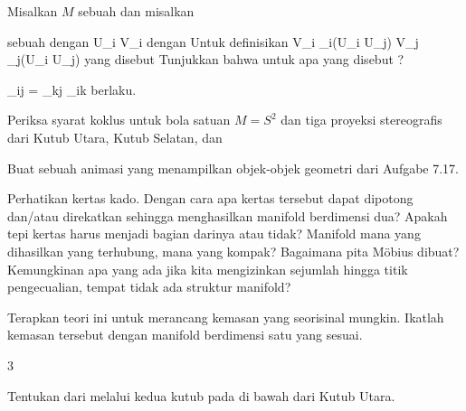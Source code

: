 {}
{

Misalkan $M$ sebuah
dan misalkan

 sebuah
dengan
 {U_i } { V_i
} {}
dengan
 Untuk
 definisikan
 {V_i \cap \alpha_i(U_i \cap U_j)  } { V_j \cap \alpha_j(U_i \cap U_j)
} {}
yang disebut
Tunjukkan bahwa untuk
 apa yang disebut  {}
 {?} {}

\mavergleichskettedisp
{\vergleichskette
{ \varphi_{ij}
}
{ =} {\varphi_{kj} \circ \varphi_{ik}
}
{ } {
}
{ } {
}
{ } {
}
}
{}{}{}
berlaku.

}
{} {}

{}
{

Periksa syarat koklus
 {} {}
untuk bola satuan $M=S^2$ dan tiga proyeksi stereografis dari Kutub Utara, Kutub Selatan, dan

}
{} {}

{}
{

Buat sebuah animasi yang menampilkan objek-objek geometri dari
Aufgabe 7.17.

}
{} {}

{}
{

Perhatikan kertas kado. Dengan cara apa kertas tersebut dapat dipotong dan/atau direkatkan sehingga menghasilkan manifold berdimensi dua? Apakah tepi kertas harus menjadi bagian darinya atau tidak? Manifold mana yang dihasilkan yang terhubung, mana yang kompak? Bagaimana pita Möbius dibuat? Kemungkinan apa yang ada jika kita mengizinkan sejumlah hingga titik pengecualian, tempat tidak ada struktur manifold?

Terapkan teori ini untuk merancang kemasan yang seorisinal mungkin. Ikatlah kemasan tersebut dengan manifold berdimensi satu yang sesuai.

}
{} {}


{3}
{

Tentukan
 dari
melalui kedua kutub pada
 di bawah
dari Kutub Utara.

}
{} {}

